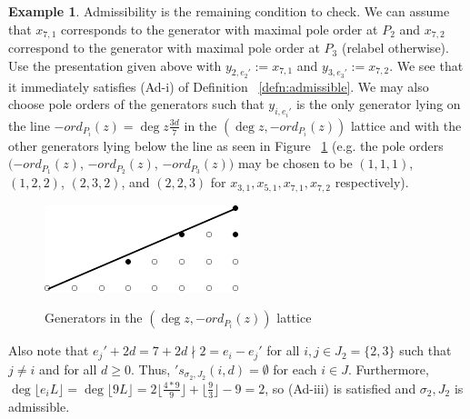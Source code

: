 \documentclass{amsart}
\theoremstyle{plain}
\theoremstyle{definition}
\newtheorem{example}[thm]{Example}
\theoremstyle{remark}
\numberwithin{equation}{section}
\newcommand \halfcan{L}
\begin{document}
\begin{example}
Admissibility is the remaining condition to check. We can assume
that $x_{7, 1}$ corresponds to the generator with maximal pole order
at $P_2$ and $x_{7, 2}$ correspond to the generator with maximal
pole order at $P_3$ (relabel otherwise). Use the presentation given
above with $y _{2, e_2'} := x_{7, 1}$ and $y_{3, e_3'} :=  x_{7, 2}$.
We see that it immediately satisfies (Ad-i) of Definition
~\ref{defn:admissible}. We may also choose pole orders of the generators
such that $y_{i, e_i'}$ is the only generator lying on the line
$-ord_{P_i}(z) = \deg z \frac{3d}{7}$ in the $(\deg z, -ord_{P_i}(z))$
 lattice and with the other generators lying below the line as seen
in Figure ~\ref{fig:377} (e.g. the pole orders $(-ord_{P_1}(z)$,
$-ord_{P_2}(z)$, $-ord_{P_3}(z))$ may be chosen to be $(1, 1, 1)$,
$(1, 2, 2)$, $(2, 3, 2)$, and $(2, 2, 3)$ for $x_{3, 1}, x_{5, 1},
x_{7, 1}, x_{7, 2}$ respectively).

\begin{figure}[H]
\label{fig:377}
\includegraphics{pics/spin-377-pic-pics.pdf} \\
\caption{Generators in the $(\deg z, -ord_{P_i}(z))$ lattice}
\end{figure}

Also note that $e_j' + 2d = 7 + 2d \nmid 2 = e_i - e_j'$ for all
$i, j \in J_2 = \{2, 3\}$ such that $j \neq i$ and for all $d \geq
0$. Thus, $'s_{\sigma_2, J_2}(i, d) = \emptyset$ for each $i \in J$.
Furthermore, $\deg \lfloor e_i \halfcan \rfloor = \deg \lfloor 9
\halfcan \rfloor = 2 \lfloor \frac{4 * 9}{9} \rfloor + \lfloor
\frac{9}{3} \rfloor - 9 = 2$, so (Ad-iii) is satisfied and
$\sigma_2, J_2$ is admissible.
\end{example}
\end{document}
